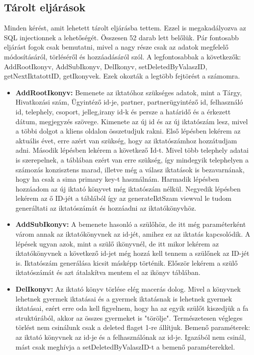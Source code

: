 \documentclass[
]{thesis-ekf}
\theoremstyle{definition}
\theoremstyle{remark}
\begin{document}
\subsection{Tárolt eljárások}
Minden kérést, amit lehetett tárolt eljárásba tettem. Ezzel is megakadályozva az SQL injectionnek a lehetőségét. Összesen 52 darab lett belőlük. Pár fontosabb eljárást fogok csak bemutatni, mivel a nagy része csak az adatok megfelelő módosításáról, törléséről és hozzáadásáról szól. A legfontosabbak a következők:
AddRootIkonyv, AddSubIkonyv, DelIkonyv, setDeletedByValaszID, getNextIktatottID, getIkonyvek. Ezek okozták a legtöbb fejtörést a számomra.
\begin{itemize}[leftmargin=0pt]
	\item[] \textbf{AddRootIkonyv: }Bemenete az iktatóhoz szükséges adatok, mint a Tárgy, Hivatkozási szám, Ügyintéző id-je, partner, partnerügyintéző id, felhasználó id, telephely, csoport, jelleg,irany id-k és persze a határidő és a érkezett dátum, megjegyzés szövege. Kimenete az új id és az új iktatószám lesz, mivel a többi dolgot a kliens oldalon összetudjuk rakni. Első lépésben lekérem az aktuális évet, erre azért van szükség, hogy az iktatószámhoz hozzátudjam adni. Második lépésben lekérem a következő Id-t. Mivel több telephely adatai is szerepelnek, a táblában ezért van erre szükség, így mindegyik telephelyen a számozás konzisztens marad, illetve még a válasz iktatások is bezavarnának, hogy ha csak a sima primary key-t használnám. Harmadik lépésben hozzáadom az új iktató könyvet még iktatószám nélkül. Negyedik lépésben lekérem az ő ID-jét a táblából így az generateIktSzam viewval le tudom generáltati az iktatószámát és hozzáadni az iktatókönyvhöz. 
	\item[] \textbf{AddSubIkonyv: }A bemenete hasonló a szülőhöz, de itt még paraméterként várom annak az iktatókönyvnek az id-jét, amihez ez az iktatás kapcsolódik. A lépések ugyan azok, mint a szülő ikönyvnél, de itt mikor lekérem az iktatókönyvnek a következő id-jet még hozzá kell tennem a szülőnek az ID-jét is. Iktatószám generálása kicsit másképp történik. Először lekérem a szülő iktatószámát és azt átalakítva mentem el az ikönyv táblában.
	\item[] \textbf{DelIkonyv: }Az iktató könyv törlése elég macerás dolog. Mivel a könyvnek lehetnek gyermek iktatásai és a gyermek iktatásnak is lehetnek gyermek iktatásai, ezért erre oda kell figyelnem, hogy ha az egyik szülőt kiszedjük a fa struktúrából, akkor az összes gyermeket is "törölje". Természetesen végleges törlést nem csinálunk csak a deleted flaget 1-re állítjuk. Bemenő paraméterek: az iktató könyvnek az id-je és a felhasználónak az id-je. Igazából nem csinál, mást csak meghívja a setDeletedByValaszID-t a bemenő paraméterekkel.

\end{itemize}
\end{document}
